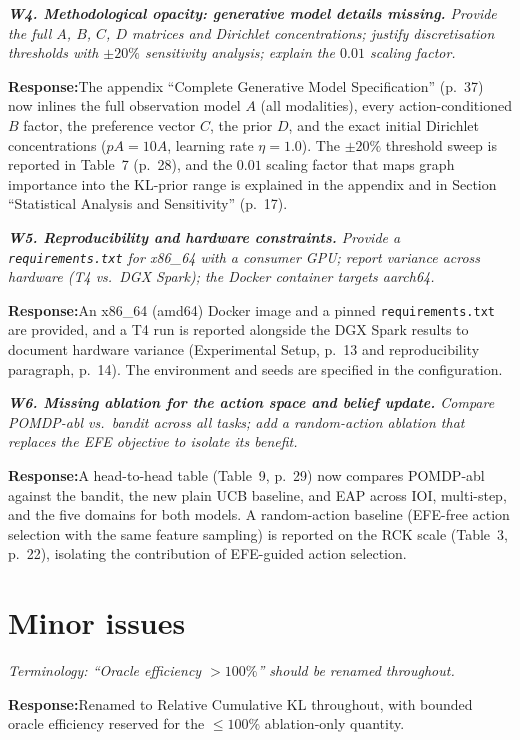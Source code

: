 \documentclass[11pt]{article}
\newenvironment{comment}{%
  \def\FrameCommand{{\color{commentrule}\vrule width 3pt}\hspace{0pt}%
    \fboxsep=8pt\colorbox{commentbg}}%
  \MakeFramed{\advance\hsize-\width\FrameRestore}%
  \itshape\small}{\endMakeFramed}
\newcommand{\response}{\par\smallskip\noindent\textbf{Response:}\;}
\begin{document}
\begin{comment}
\textbf{W4. Methodological opacity: generative model details missing.} Provide the
full $A$, $B$, $C$, $D$ matrices and Dirichlet concentrations; justify
discretisation thresholds with $\pm20\%$ sensitivity analysis; explain the $0.01$
scaling factor.
\end{comment}
\response The appendix ``Complete Generative Model Specification'' (p.~37) now
inlines the full observation model $A$ (all modalities), every action-conditioned
$B$ factor, the preference vector $C$, the prior $D$, and the exact initial
Dirichlet concentrations ($pA = 10A$, learning rate $\eta=1.0$). The $\pm20\%$
threshold sweep is reported in Table~7 (p.~28), and the $0.01$ scaling factor that
maps graph importance into the KL-prior range is explained in the appendix and in
Section ``Statistical Analysis and Sensitivity'' (p.~17).

\begin{comment}
\textbf{W5. Reproducibility and hardware constraints.} Provide a
\texttt{requirements.txt} for x86\_64 with a consumer GPU; report variance across
hardware (T4 vs.\ DGX Spark); the Docker container targets aarch64.
\end{comment}
\response An x86\_64 (amd64) Docker image and a pinned \texttt{requirements.txt}
are provided, and a T4 run is reported alongside the DGX Spark results to document
hardware variance (Experimental Setup, p.~13 and reproducibility paragraph,
p.~14). The environment and seeds are specified in the configuration.

\begin{comment}
\textbf{W6. Missing ablation for the action space and belief update.} Compare
POMDP-abl vs.\ bandit across all tasks; add a random-action ablation that replaces
the EFE objective to isolate its benefit.
\end{comment}
\response A head-to-head table (Table~9, p.~29) now compares POMDP-abl against the
bandit, the new plain UCB baseline, and EAP across IOI, multi-step, and the five
domains for both models. A random-action baseline (EFE-free action selection with
the same feature sampling) is reported on the RCK scale (Table~3, p.~22), isolating
the contribution of EFE-guided action selection.

\section*{Minor issues}

\begin{comment}
Terminology: ``Oracle efficiency $>100\%$'' should be renamed throughout.
\end{comment}
\response Renamed to Relative Cumulative KL throughout, with bounded oracle
efficiency reserved for the $\leq100\%$ ablation-only quantity.
\end{document}

